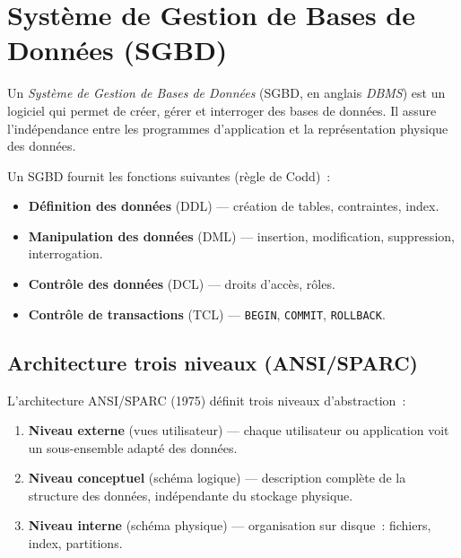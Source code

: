 \section{Syst\`eme de Gestion de Bases de Donn\'ees (SGBD)}

\begin{definition}[SGBD]
Un \emph{Syst\`eme de Gestion de Bases de Donn\'ees} (SGBD, en anglais \emph{DBMS}) est un
logiciel qui permet de cr\'eer, g\'erer et interroger des bases de donn\'ees.
Il assure l'ind\'ependance entre les programmes d'application et la
repr\'esentation physique des donn\'ees.
\end{definition}

Un SGBD fournit les fonctions suivantes (r\`egle de Codd)~:
\begin{itemize}
    \item \textbf{D\'efinition des donn\'ees} (DDL) --- cr\'eation de tables, contraintes, index.
    \item \textbf{Manipulation des donn\'ees} (DML) --- insertion, modification, suppression, interrogation.
    \item \textbf{Contr\^ole des donn\'ees} (DCL) --- droits d'acc\`es, r\^oles.
    \item \textbf{Contr\^ole de transactions} (TCL) --- \texttt{BEGIN}, \texttt{COMMIT}, \texttt{ROLLBACK}.
\end{itemize}

\subsection{Architecture trois niveaux (ANSI/SPARC)}

\begin{definition}
L'architecture ANSI/SPARC (1975) d\'efinit trois niveaux d'abstraction~:
\begin{enumerate}
    \item \textbf{Niveau externe} (vues utilisateur) --- chaque utilisateur ou application
          voit un sous-ensemble adapt\'e des donn\'ees.
    \item \textbf{Niveau conceptuel} (sch\'ema logique) --- description compl\`ete de la
          structure des donn\'ees, ind\'ependante du stockage physique.
    \item \textbf{Niveau interne} (sch\'ema physique) --- organisation sur disque~: fichiers,
          index, partitions.
\end{enumerate}
\end{definition}

